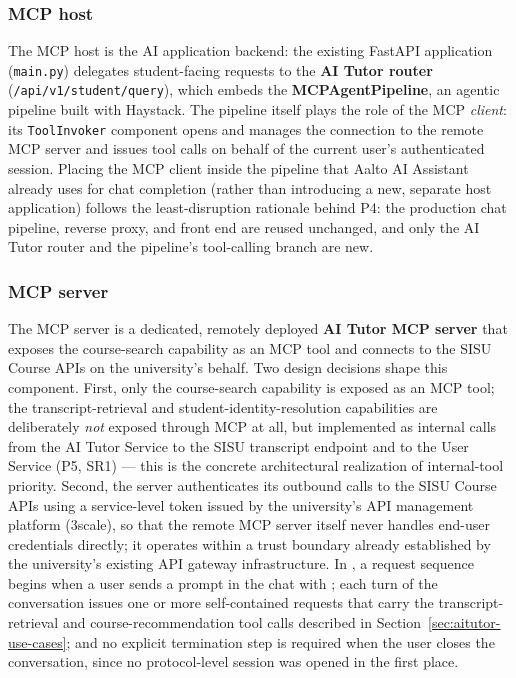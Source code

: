 \documentclass[english, 12pt, a4paper, elec, utf8, a-2b, online]{aaltothesis}
\newcommand{\aitutor}{\text{AI Tutor}\xspace}
\begin{document}
\subsubsection{MCP host}
The MCP host is the AI application backend: the existing FastAPI application (\texttt{main.py}) delegates
student-facing requests to the \textbf{AI Tutor router} (\texttt{/api/v1/student/query}), which embeds
the \textbf{MCPAgentPipeline}, an agentic pipeline built with Haystack. The pipeline itself plays the
role of the MCP \emph{client}: its \texttt{ToolInvoker} component opens and manages the connection to
the remote MCP server and issues tool calls on behalf of the current user's authenticated session.
Placing the MCP client inside the pipeline that Aalto AI Assistant already uses for chat completion
(rather than introducing a new, separate host application) follows the least-disruption rationale
behind P4: the production chat pipeline, reverse proxy, and front end are reused unchanged, and only
the AI Tutor router and the pipeline's tool-calling branch are new.
 
\subsubsection{MCP server}
The MCP server is a dedicated, remotely deployed \textbf{AI Tutor MCP server} that exposes the
course-search capability as an MCP tool and connects to the SISU Course APIs on the university's
behalf. Two design decisions shape this component. First, only the course-search capability is
exposed as an MCP tool; the transcript-retrieval and student-identity-resolution capabilities are
deliberately \emph{not} exposed through MCP at all, but implemented as internal calls from the AI
Tutor Service to the SISU transcript endpoint and to the User Service (P5, SR1) --- this is the
concrete architectural realization of internal-tool priority. Second, the server authenticates its
outbound calls to the SISU Course APIs using a service-level token issued by the university's API
management platform (3scale), so that the remote MCP server itself never handles end-user
credentials directly; it operates within a trust boundary already established by the university's
existing API gateway infrastructure.
In \aitutor, a request sequence begins when a user sends a prompt in the chat with \aitutor; each turn of the conversation issues one or more self-contained requests that carry the transcript-retrieval and course-recommendation tool calls described in Section~\ref{sec:aitutor-use-cases}; and no explicit termination step is required when the user closes the conversation, since no protocol-level session was opened in the first place.
\end{document}
